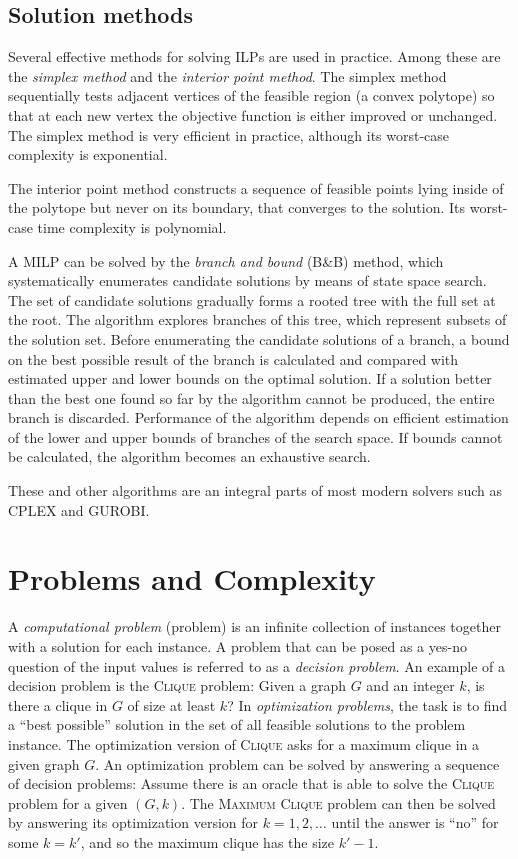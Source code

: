 \subsection{Solution methods}

Several effective methods for solving ILPs are used in practice.
Among these are the \emph{simplex method} and the \emph{interior point method}.
The simplex method sequentially tests adjacent vertices of the feasible region (a convex polytope) 
so that at each new vertex the objective function is either improved or unchanged.
The simplex method is very efficient in practice, although its worst-case complexity is exponential.

The interior point method constructs a sequence of feasible points lying inside of the polytope but never on its boundary, that converges to the solution.
Its worst-case time complexity is polynomial.

A MILP can be solved by the \emph{branch and bound} (B\&B) method, which systematically enumerates candidate solutions by means of state space search.
The set of candidate solutions gradually forms a rooted tree with the full set at the root. 
The algorithm explores branches of this tree, which represent subsets of the solution set. 
Before enumerating the candidate solutions of a branch, a bound on the best possible result of the branch is calculated and compared with estimated upper and lower bounds on the optimal solution.
If a solution better than the best one found so far by the algorithm cannot be produced, the entire branch is discarded.
Performance of the algorithm depends on efficient estimation of the lower and upper bounds of branches of the search space. 
If bounds cannot be calculated, the algorithm becomes  an exhaustive search.

These and other algorithms are an integral parts of most modern solvers such as CPLEX and GUROBI.

\section{Problems and Complexity}\label{sect:probcomp}

A \emph{computational problem} (problem) is an infinite collection of instances together with a solution for each instance.
A problem that can be posed as a yes-no question of the input values is referred to as a \emph{decision problem}.
An example of a decision problem is the \textsc{Clique} problem: Given a graph $G$ and an integer $k$, is there a clique in $G$ of size at least $k$?
In \emph{optimization problems}, the task is to find a ``best possible'' solution in the set of all feasible solutions to the problem instance.
The optimization version of \textsc{Clique} asks for a maximum clique in a given graph $G$.
An optimization problem can be solved by answering a sequence of decision problems:
Assume there is an oracle that is able to solve the \textsc{Clique} problem for a given $(G,k)$.
The \textsc{Maximum Clique} problem can then be solved by answering its optimization version for $k=1,2,\dots$ until the answer is ``no'' for some $k=k'$, and so the maximum clique has the size $k'-1$.

